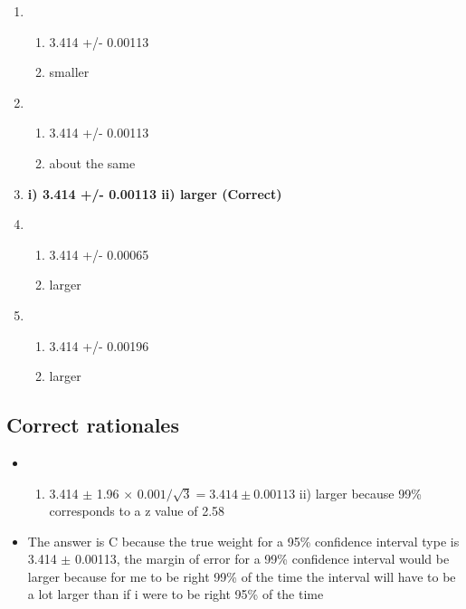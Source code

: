 \documentclass[letterpaper,9pt,twoside,printwatermark=false]{pinp}
\providecommand{\tightlist}{%
  \setlength{\itemsep}{0pt}\setlength{\parskip}{0pt}}
\begin{document}
\begin{enumerate}
\def\labelenumi{\alph{enumi}.}
\item
  \begin{enumerate}
  \def\labelenumii{\roman{enumii})}
  \tightlist
  \item
    3.414 +/- 0.00113
  \item
    smaller
  \end{enumerate}
\item
  \begin{enumerate}
  \def\labelenumii{\roman{enumii})}
  \tightlist
  \item
    3.414 +/- 0.00113
  \item
    about the same
  \end{enumerate}
\item
  \textbf{i) 3.414 +/- 0.00113 ii) larger (Correct)}
\item
  \begin{enumerate}
  \def\labelenumii{\roman{enumii})}
  \tightlist
  \item
    3.414 +/- 0.00065
  \item
    larger
  \end{enumerate}
\item
  \begin{enumerate}
  \def\labelenumii{\roman{enumii})}
  \tightlist
  \item
    3.414 +/- 0.00196
  \item
    larger
  \end{enumerate}
\end{enumerate}

\subsection{Correct rationales}\label{correct-rationales-3}

\begin{itemize}
\item
  \begin{enumerate}
  \def\labelenumi{\roman{enumi})}
  \tightlist
  \item
    3.414 \(\pm\) 1.96 \(\times\) \(0.001/\sqrt{3} = 3.414 \pm 0.00113\)
    ii) larger because 99\% corresponds to a z value of 2.58
  \end{enumerate}
\item
  The answer is C because the true weight for a 95\% confidence interval
  type is 3.414 \(\pm\) 0.00113, the margin of error for a 99\%
  confidence interval would be larger because for me to be right 99\% of
  the time the interval will have to be a lot larger than if i were to
  be right 95\% of the time
\end{itemize}
\end{document}
